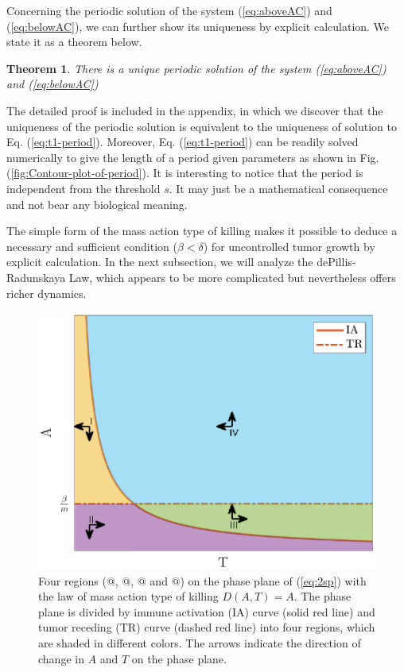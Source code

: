 \documentclass[review,authoryear]{elsarticle}
\makeatletter
\newtheorem{theorem}{Theorem}
\newcommand*{\rom}[1]{\expandafter\@slowromancap\romannumeral #1@}
\makeatother
\begin{document}
Concerning the periodic solution of the system (\ref{eq:aboveAC}) and (\ref{eq:belowAC}), we can further show its uniqueness by explicit calculation. We state it as a theorem below.  
\begin{theorem} \label{thm:unique}
There is a unique periodic solution of the system (\ref{eq:aboveAC}) and (\ref{eq:belowAC})
\end{theorem}
 The detailed proof is included in the appendix, in which we discover that the uniqueness of the periodic solution is equivalent to the uniqueness of solution to Eq. (\ref{eq:t1-period}). Moreover, Eq. (\ref{eq:t1-period}) can be readily
solved numerically to give the length of a period given parameters
as shown in Fig. (\ref{fig:Contour-plot-of-period}). It is interesting
to notice that the period is independent from the threshold $s$.
It may just be a mathematical consequence and not bear any biological
meaning. 

The simple form of the mass action type of killing makes it possible to deduce a necessary and sufficient condition ($\beta<\delta$) for uncontrolled tumor growth by explicit calculation. In the next subsection, we will analyze the dePillis-Radunskaya Law, which appears to be more complicated but nevertheless offers richer dynamics.  

\begin{figure}
\centerline{\includegraphics[width=1\linewidth]{figs/DA-colored-regions}}

\caption{Four regions (\rom{1}, \rom{2}, \rom{3} and \rom{4}) on the phase plane of (\ref{eq:2sp}) with the law of mass action type of killing $D(A,T)=A$. The phase plane is divided by immune activation (IA) curve (solid red line) and tumor receding (TR) curve (dashed red line) into four regions, which are 
shaded in different colors. The arrows indicate the direction of change in $A$ and $T$ on the phase plane. \label{fig:DA-PP-4regions}}
\end{figure}
\end{document}

